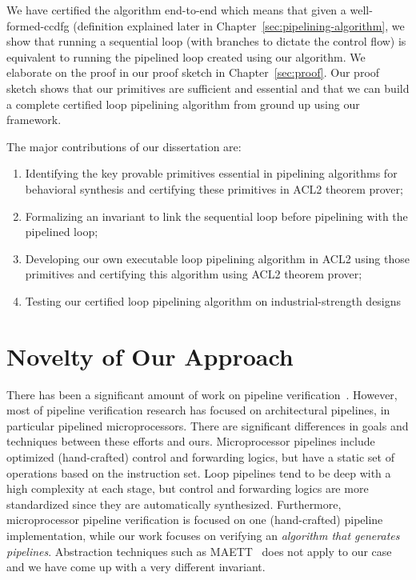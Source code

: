 We have certified the algorithm end-to-end which means that given a well-formed-ccdfg (definition explained later in Chapter~\ref{sec:pipelining-algorithm}, we show that running a sequential loop (with branches to dictate the control flow) is equivalent to running the pipelined loop created using our algorithm. We elaborate on the proof in our proof sketch in Chapter~\ref{sec:proof}. Our proof sketch shows that our primitives are sufficient and essential and that we can build a complete certified loop pipelining algorithm from ground up using our framework.

The major contributions of our dissertation are:
\begin{enumerate}[--]
\item Identifying the key provable primitives essential in pipelining algorithms for behavioral synthesis and certifying these primitives in ACL2 theorem prover;
\item Formalizing an invariant to link the sequential loop before pipelining with the pipelined loop;
\item Developing our own executable loop pipelining algorithm in ACL2 using those primitives and certifying this algorithm using ACL2 theorem prover;
\item Testing our certified loop pipelining algorithm on industrial-strength designs
\end{enumerate}

\section {Novelty of Our Approach}
There has been a significant amount of work on pipeline
verification~\cite{bd:pipeline,sh:pipeline,pm:pipelines,velev05}.
However, most of pipeline verification research has focused
on architectural pipelines, in particular pipelined
microprocessors. There are significant differences in goals
and techniques between these efforts and ours.
Microprocessor pipelines include optimized (hand-crafted)
control and forwarding logics, but have a static set of
operations based on the instruction set.  Loop pipelines
tend to be deep with a high complexity at each stage, but
control and forwarding logics are more standardized since
they are automatically synthesized.  
Furthermore, microprocessor pipeline verification
is focused on one (hand-crafted) pipeline implementation,
while our work focuses on verifying an {\em algorithm
that generates pipelines}.  Abstraction techniques
such as MAETT~\cite{sh:pipeline} does not apply to our case
and we have come up with a very different invariant.

